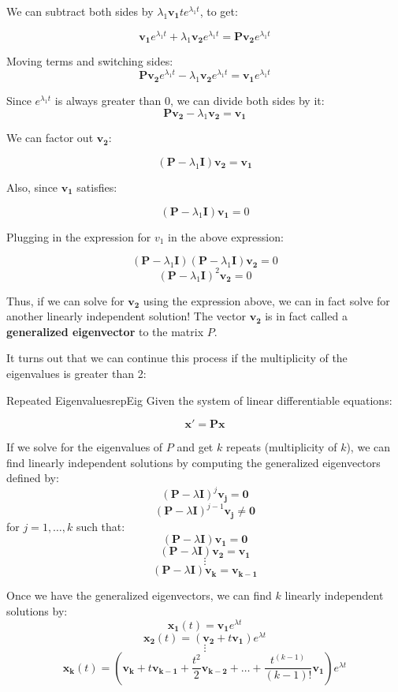 \documentclass{report}
\begin{document}
We can subtract both sides by  $\lambda_1\mathbf{v_1}te^{\lambda_1 t}$, to get:

$$\mathbf{v_1}e^{\lambda_1 t} + \lambda_1\mathbf{v_2}e^{\lambda_1 t} = \mathbf{P}\mathbf{v_2}e^{\lambda_1 t}$$

Moving terms and switching sides:
$$\mathbf{P}\mathbf{v_2}e^{\lambda_1 t} - \lambda_1\mathbf{v_2}e^{\lambda_1 t} = \mathbf{v_1}e^{\lambda_1 t}  $$

Since $e^{\lambda_1 t}$ is always greater than 0, we can divide both sides by it:
$$\mathbf{P}\mathbf{v_2} - \lambda_1\mathbf{v_2} = \mathbf{v_1} $$

We can factor out $\mathbf{v_2}$:

$$(\mathbf{P}-\lambda_1\mathbf{I})\mathbf{v_2} = \mathbf{v_1} $$

Also, since $\mathbf{v_1}$ satisfies:

$$(\mathbf{P}-\lambda_1\mathbf{I})\mathbf{v_1} = 0$$

Plugging in the expression for $v_1$ in the above expression:

$$(\mathbf{P}-\lambda_1\mathbf{I})(\mathbf{P}-\lambda_1\mathbf{I})\mathbf{v_2} = 0$$
$$(\mathbf{P}-\lambda_1\mathbf{I})^2\mathbf{v_2} = 0$$


Thus, if we can solve for $\mathbf{v_2}$ using the expression above, we can in fact solve for another linearly independent solution! The vector $\mathbf{v_2}$ is in fact called a \textbf{generalized eigenvector} to the matrix $P$.


It turns out that we can continue this process if the multiplicity of the eigenvalues is greater than 2:

\begin{mytheo}{Repeated Eigenvalues}{repEig}
    Given the system of linear differentiable equations:
    
    $$\mathbf{x'} = \mathbf{Px}$$
    
    If we solve for the eigenvalues of $P$ and get $k$ repeats (multiplicity of $k$), we can find linearly independent solutions by computing the generalized eigenvectors defined by:
    $$(\mathbf{P}-\lambda\mathbf{I})^j\mathbf{v_j} = \mathbf{0} $$
    $$(\mathbf{P}-\lambda\mathbf{I})^{j-1}\mathbf{v_j} \neq \mathbf{0}$$
    for $j = 1, \dots, k$
    such that:
    $$(\mathbf{P}-\lambda\mathbf{I})\mathbf{v_1} = \mathbf{0}$$
    $$(\mathbf{P}-\lambda\mathbf{I})\mathbf{v_2} = \mathbf{v_1}$$
    $$\vdots$$
    $$(\mathbf{P}-\lambda\mathbf{I})\mathbf{v_k} = \mathbf{v_{k-1}}$$
    
    Once we have the generalized eigenvectors, we can find $k$ linearly independent solutions by:
    $$\mathbf{x_1}(t) = \mathbf{v_1}e^{\lambda t}$$
    $$\mathbf{x_2}(t) = (\mathbf{v_2} + t\mathbf{v_1})e^{\lambda t}$$
    $$\vdots$$
    $$\mathbf{x_k}(t) = \left(\mathbf{v_k} + t\mathbf{v_{k-1}} + \frac{t^2}{2}\mathbf{v_{k-2}} + \dots + \frac{t^{(k-1)}}{(k-1)!}\mathbf{v_1}\right)e^{\lambda t}$$
\end{mytheo}
\end{document}
